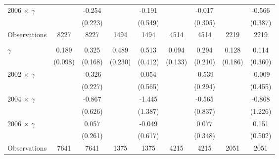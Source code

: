 {\begin{tabular}{l*{8}{c}}
2006 $\times$ $\gamma$&                  &   -0.254         &                  &   -0.191         &                  &   -0.017         &                  &   -0.566         \\
                &                  &  (0.223)         &                  &  (0.549)         &                  &  (0.305)         &                  &  (0.387)         \\
\midrule
Observations    &     8227         &     8227         &     1494         &     1494         &     4514         &     4514         &     2219         &     2219         \\

\midrule
\addlinespace
\multicolumn{9}{l}{\textit{Panel E: Emotional support score (\%)}} \\
$\gamma$        &    0.189\sym{*}  &    0.325\sym{*}  &    0.489\sym{**} &    0.513         &    0.094         &    0.294         &    0.128         &    0.114         \\
                &  (0.098)         &  (0.168)         &  (0.230)         &  (0.412)         &  (0.133)         &  (0.210)         &  (0.186)         &  (0.360)         \\


2002 $\times$ $\gamma$&                  &   -0.326         &                  &    0.054         &                  &   -0.539\sym{*}  &                  &   -0.009         \\
                &                  &  (0.227)         &                  &  (0.565)         &                  &  (0.294)         &                  &  (0.455)         \\

2004 $\times$ $\gamma$&                  &   -0.867         &                  &   -1.445         &                  &   -0.565         &                  &   -0.868         \\
                &                  &  (0.626)         &                  &  (1.387)         &                  &  (0.837)         &                  &  (1.226)         \\

2006 $\times$ $\gamma$&                  &    0.057         &                  &   -0.049         &                  &    0.077         &                  &    0.151         \\
                &                  &  (0.261)         &                  &  (0.617)         &                  &  (0.348)         &                  &  (0.502)         \\
\midrule
Observations    &     7641         &     7641         &     1375         &     1375         &     4215         &     4215         &     2051         &     2051         \\
\bottomrule

\end{tabular}
}

